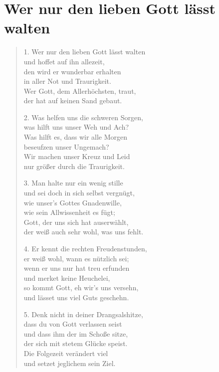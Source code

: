 \documentclass[a4paper,12pt]{article}
\begin{document}
\thispagestyle{empty}

\section*{Wer nur den lieben Gott lässt walten}

\bigskip
\begin{verse}
1. Wer nur den lieben Gott lässt walten\\
und hoffet auf ihn allezeit,\\
den wird er wunderbar erhalten\\
in aller Not und Traurigkeit.\\
Wer Gott, dem Allerhöchsten, traut,\\
der hat auf keinen Sand gebaut.

2. Was helfen uns die schweren Sorgen,\\
was hilft uns unser Weh und Ach?\\
Was hilft es, dass wir alle Morgen\\
beseufzen unser Ungemach?\\
Wir machen unser Kreuz und Leid\\
nur größer durch die Traurigkeit.

3. Man halte nur ein wenig stille\\
und sei doch in sich selbst vergnügt,\\
wie unser's Gottes Gnadenwille,\\
wie sein Allwissenheit es fügt;\\
Gott, der uns sich hat auserwählt,\\
der weiß auch sehr wohl, was uns fehlt.

4. Er kennt die rechten Freudenstunden,\\
er weiß wohl, wann es nützlich sei;\\
wenn er uns nur hat treu erfunden\\
und merket keine Heuchelei,\\
so kommt Gott, eh wir's uns versehn,\\
und lässet uns viel Guts geschehn.

5. Denk nicht in deiner Drangsalshitze,\\
dass du von Gott verlassen seist\\
und dass ihm der im Schoße sitze,\\
der sich mit stetem Glücke speist.\\
Die Folgezeit verändert viel\\
und setzet jeglichem sein Ziel.


\end{verse}
\end{document}
